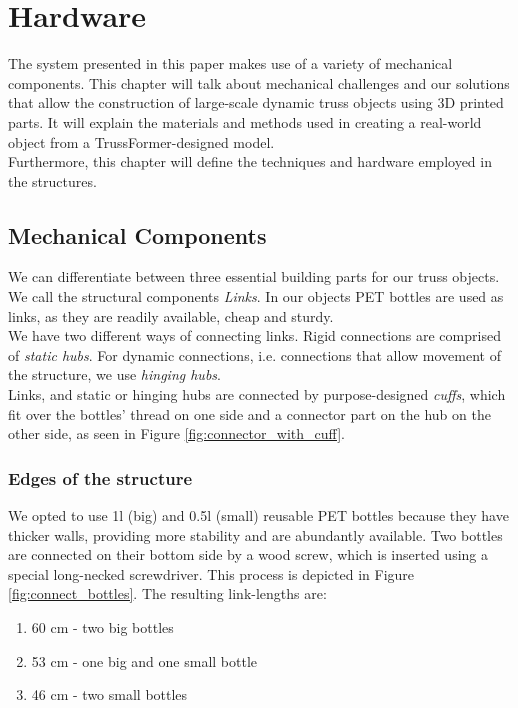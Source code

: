 \chapter{Hardware}\label{ch:hardware}
The system presented in this paper makes use of a variety of mechanical components. This chapter will talk about mechanical challenges and our solutions that allow the construction of large-scale dynamic truss objects using 3D printed parts. It will explain the materials and methods used in creating a real-world object from a TrussFormer-designed model.\\
Furthermore, this chapter will define the techniques and hardware employed in the structures.

\section{Mechanical Components}
We can differentiate between three essential building parts for our truss objects. We call the structural components \textit{Links}. In our objects PET bottles are used as links, as they are readily available, cheap and sturdy.\\
We have two different ways of connecting links. Rigid connections are comprised of \textit{static hubs}. For dynamic connections, i.e. connections that allow movement of the structure, we use \textit{hinging hubs}.\\
Links, and static or hinging hubs are connected by purpose-designed \textit{cuffs}, which fit over the bottles' thread on one side and a connector part on the hub on the other side, as seen in Figure \ref{fig:connector_with_cuff}.

\subsection{Edges of the structure}
We opted to use 1l (big) and 0.5l (small) reusable PET bottles because they have thicker walls, providing more stability and are abundantly available. Two bottles are connected on their bottom side by a wood screw, which is inserted using a special long-necked screwdriver. This process is depicted in Figure \ref{fig:connect_bottles}. The resulting link-lengths are:
\begin{enumerate}
\item 60 cm - two big bottles
\item 53 cm - one big and one small bottle
\item 46 cm - two small bottles
\end{enumerate}

